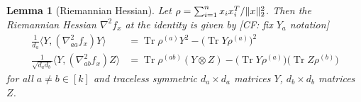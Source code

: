 \documentclass[aos]{imsart}
\newtheorem{lemma}[theorem]{Lemma}
\theoremstyle{definition}
\DeclareMathOperator{\tr}{Tr}
\DeclarePairedDelimiter{\norm}{\lVert}{\rVert}
\newcommand{\ot}{\otimes}
\newcommand{\samp}{x}
\newcommand{\CF}[1]{{\color{purple}[CF: #1]}}
\begin{document}
\begin{lemma}[Riemannian Hessian]\label{lem:hessian}
Let $\rho = \sum_{i=1}^n \samp_i \samp_i^T / \norm{\samp}_2^2$.
Then the Riemannian Hessian $\nabla^2 f_{\samp}$ at the identity is given by \CF{fix $Y_a$ notation}
\begin{align*}
 \frac{1}{d_a} \langle Y,  \left( \nabla^2_{aa} f_{\samp} \right) Y \rangle
&=  \tr \rho^{(a)} Y^2 - \bigl(\tr Y \rho^{(a)}\bigr)^2 \\
  \frac1{\sqrt{d_a d_b}} \langle Y,  \left( \nabla^2_{ab} f_{\samp} \right) Z \rangle
&= \tr \rho^{(ab)} \left( Y \ot Z \right) - \bigl(\tr Y \rho^{(a)}\bigr)\bigl(\tr Z \rho^{(b)}\bigr)
\end{align*}
for all $a\neq b\in[k]$ and traceless symmetric $d_a\times d_a$ matrices $Y$, $d_b\times d_b$ matrices~$Z$.
\end{lemma}
\end{document}
